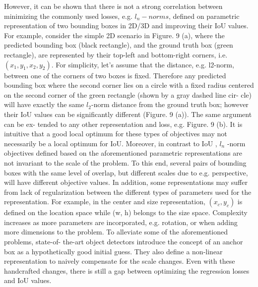 \documentclass[12pt]{article}
\begin{document}
However, it can be shown that there is not a strong correlation between minimizing the commonly used losses, e.g. $l_{n}-norms$, defined on parametric representation of two bounding boxes in 2D/3D and improving their IoU values. For example, consider the simple 2D scenario in Figure. 9 (a), where the predicted bounding box (black rectangle), and the ground truth box (green rectangle), are represented by their top-left and bottom-right corners, i.e. $(x_{1} , y_{1} , x_{2} , y_{2} )$. For simplicity, let’s assume that the distance, e.g. l2-norm, between one of the corners of two boxes is fixed. Therefore any predicted bounding box where the second corner lies on a circle with a fixed radius centered on the second corner of the green rectangle (shown by a gray dashed line cir- cle) will have exactly the same $l_{2}$-norm distance from the ground truth box; however their IoU values can be significantly different (Figure. 9 (a)). The same argument can be ex- tended to any other representation and loss, e.g. Figure. 9 (b). It is intuitive that a good local optimum for these types of objectives may not necessarily be a local optimum for IoU. Moreover, in contrast to IoU , $l_{n}$ -norm objectives defined based on the aforementioned parametric representations are not invariant to the scale of the problem. To this end, several pairs of bounding boxes with the same level of overlap, but different scales due to e.g. perspective, will have different objective values. In addition, some representations may suffer from lack of regularization between the different types of parameters used for the representation. For example, in the center and size representation, $(x_{c}, y_{c})$ is defined on the location space while (w, h) belongs to the size space. Complexity increases as more parameters are incorporated, e.g. rotation, or when adding more dimensions to the problem. To alleviate some of the aforementioned problems, state-of- the-art object detectors introduce the concept of an anchor box as a hypothetically good initial guess. They also define a non-linear representation to naively compensate for the scale changes. Even with these handcrafted changes, there is still a gap between optimizing the regression losses and IoU values.
\end{document}
